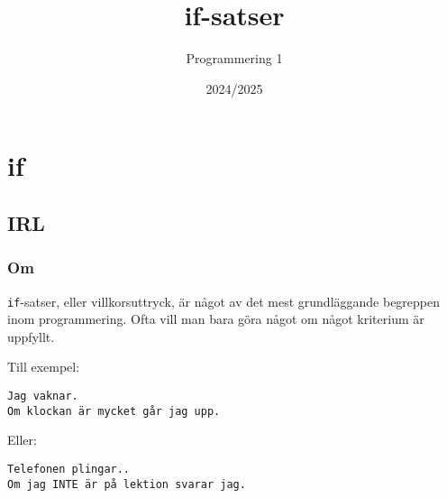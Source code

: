 \documentclass[aspectratio=169]{beamer}
\begin{document}


\title{if-satser}
\author{Programmering 1}
\date{2024/2025}

\maketitle

\section{if}

\subsection{IRL}

\begin{frame}[fragile]
\frametitle{Om}
	
	\lstinline{if}-satser, eller villkorsuttryck, är något av det mest grundläggande begreppen inom programmering. Ofta vill man bara göra något om något kriterium är uppfyllt.
	
	Till exempel:
	
	\begin{verbatim}
Jag vaknar.
Om klockan är mycket går jag upp.
	\end{verbatim} \pause
	
	Eller:
	
	\begin{verbatim}
Telefonen plingar..
Om jag INTE är på lektion svarar jag.
	\end{verbatim}

\end{frame}
\end{document}
